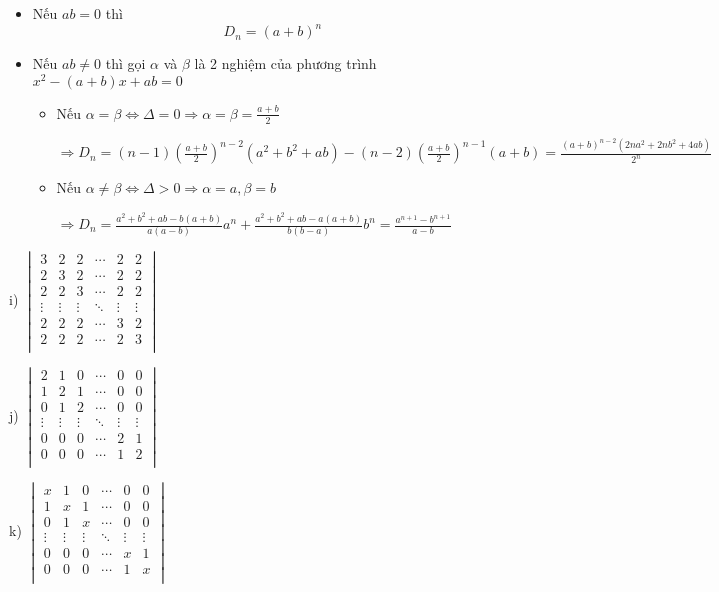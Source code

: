 \documentclass[12pt]{report}
\begin{document}
\begin{itemize}
	\item Nếu $ab = 0$ thì \[ D_n = (a+b)^n \]
	\item Nếu $ab \neq 0$ thì gọi $\alpha$ và $\beta$ là 2 nghiệm của phương trình $x^2 - (a+b)x + ab = 0$
	\begin{itemize}
		\item Nếu $\alpha = \beta \Leftrightarrow \Delta = 0 \Rightarrow \alpha = \beta = \frac{a+b}{2}$ 
		
		$\Rightarrow D_n = (n-1) \left( \frac{a+b}{2} \right)^{n-2} (a^2+b^2+ab) - (n-2) \left(\frac{a+b}{2}\right)^{n-1} (a+b) = \frac{(a+b)^{n-2}(2na^2+2nb^2+4ab)}{2^n}$
		
		\item Nếu $\alpha \neq \beta \Leftrightarrow \Delta > 0 \Rightarrow \alpha = a, \beta = b$
		
		$\Rightarrow D_n = \frac{a^2+b^2+ab - b(a+b)}{a(a-b)} a^n + \frac{a^2+b^2+ab - a(a+b)}{b(b-a)} b^n = \frac{a^{n+1} - b^{n+1}}{a-b}$
	\end{itemize}
\end{itemize}

i) $\begin{vmatrix}
	3 & 2 & 2 & \cdots & 2 & 2 \\
	2 & 3 & 2 & \cdots & 2 & 2 \\
	2 & 2 & 3 & \cdots & 2 & 2 \\
	\vdots & \vdots & \vdots & \ddots & \vdots & \vdots \\
	2 & 2 & 2 & \cdots & 3 & 2 \\
	2 & 2 & 2 & \cdots & 2 & 3 \\
\end{vmatrix}$

j) $\begin{vmatrix}
	2 & 1 & 0 & \cdots & 0 & 0 \\
	1 & 2 & 1 & \cdots & 0 & 0 \\
	0 & 1 & 2 & \cdots & 0 & 0 \\
	\vdots & \vdots & \vdots & \ddots & \vdots & \vdots \\
	0 & 0 & 0 & \cdots & 2 & 1 \\
	0 & 0 & 0 & \cdots & 1 & 2 \\
\end{vmatrix}$

k) $\begin{vmatrix}
	x & 1 & 0 & \cdots & 0 & 0 \\
	1 & x & 1 & \cdots & 0 & 0 \\
	0 & 1 & x & \cdots & 0 & 0 \\
	\vdots & \vdots & \vdots & \ddots & \vdots & \vdots \\
	0 & 0 & 0 & \cdots & x & 1 \\
	0 & 0 & 0 & \cdots & 1 & x \\
\end{vmatrix}$
\end{document}
